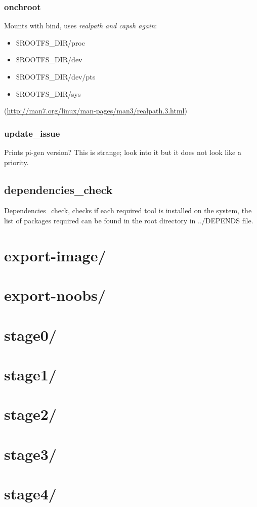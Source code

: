 \documentclass[12pt,a4paper]{report}
\begin{document}
\subsubsection{onchroot}
Mounts with bind, uses \textit{realpath and \textit{capsh} again}:
\begin{itemize}
\item{\${ROOTFS\_DIR}/proc}
\item{\${ROOTFS\_DIR}/dev}
\item{\${ROOTFS\_DIR}/dev/pts}
\item{\${ROOTFS\_DIR}/sys}
\end{itemize}
(\url{http://man7.org/linux/man-pages/man3/realpath.3.html})
\subsubsection{update\_issue}
Prints pi-gen version? This is strange; look into it but it does not look like a priority. 
\subsection{dependencies\_check}
Dependencies\_check, checks if each required tool is installed on the system, the list of packages required can be found in the root directory in  ../DEPENDS file.

\section{export-image/}
\section{export-noobs/}
\section{stage0/}
\section{stage1/}
\section{stage2/}
\section{stage3/}
\section{stage4/}
\end{document}

